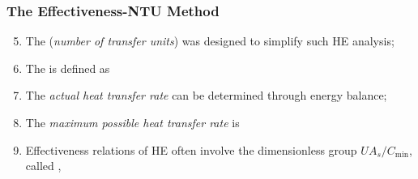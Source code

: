 \documentclass[10pt,compress,handout,ignorenonframetext,unknownkeysallowed]{beamer}
\begin{document}
\begin{frame}
  \frametitle{The Effectiveness-NTU Method}
     \begin{enumerate}\setcounter{enumi}{4}
          \item<1-> The  ({\it number of transfer units}) was designed to simplify such HE analysis;
          \item<2-> The  is defined as
          \item<2-> The {\it actual heat transfer rate} can be determined through energy balance;
          \item<3-> The {\it maximum possible heat transfer rate} is
          \item<4-> Effectiveness relations of HE often involve the dimensionless group $UA_{s}/C_{\text{min}}$, called ,
     \end{enumerate}

\end{frame}
\end{document}
